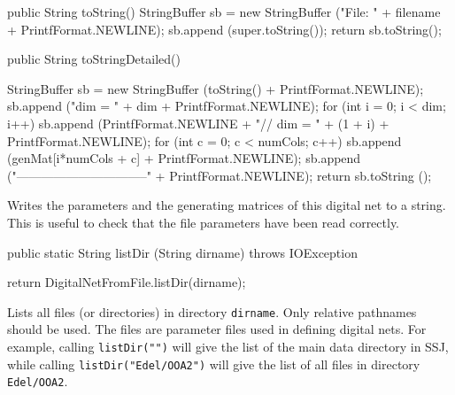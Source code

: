 \begin{code}\begin{hide} 

   public String toString() {
      StringBuffer sb = new StringBuffer ("File:  " + filename  +
         PrintfFormat.NEWLINE);
      sb.append (super.toString());
      return sb.toString();
   }\end{hide}

   public String toStringDetailed() \begin{hide} {
      StringBuffer sb = new StringBuffer (toString() + PrintfFormat.NEWLINE);
      sb.append ("dim = " + dim + PrintfFormat.NEWLINE);
      for (int i = 0; i < dim; i++) {
         sb.append (PrintfFormat.NEWLINE + "// dim = " + (1 + i) +
              PrintfFormat.NEWLINE);
         for (int c = 0; c < numCols; c++)
            sb.append  (genMat[i*numCols + c]  + PrintfFormat.NEWLINE);
      }
      sb.append ("--------------------------------" + PrintfFormat.NEWLINE);
      return sb.toString ();
   }\end{hide}
\end{code} 
\begin{tabb}
    Writes the parameters and the generating matrices of this digital net
    to a string.
    This is useful to check that the file parameters have been read correctly.
\end{tabb}
\begin{code}

   public static String listDir (String dirname) throws IOException \begin{hide} {
      return DigitalNetFromFile.listDir(dirname);
   }\end{hide}
\end{code} 
\begin{tabb}
  Lists all files (or directories) in directory \texttt{dirname}. Only relative
  pathnames should be used. The files are  parameter files used in defining
  digital nets.  For example, calling \texttt{listDir("")} will give the list
  of the main data directory in SSJ, while calling \texttt{listDir("Edel/OOA2")}
  will give the list of all files in directory \texttt{Edel/OOA2}. 
 \end{tabb}
\begin{code}
\begin{hide} 
}
\end{hide}
\end{code}
